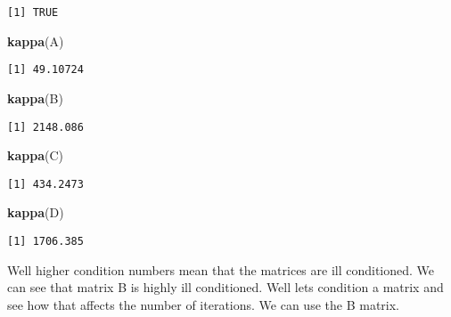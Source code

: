 \documentclass[]{article}
\newenvironment{Shaded}{\begin{snugshade}}{\end{snugshade}}
\newcommand{\KeywordTok}[1]{\textcolor[rgb]{0.13,0.29,0.53}{\textbf{#1}}}
\newcommand{\NormalTok}[1]{#1}
\begin{document}
\begin{verbatim}
[1] TRUE
\end{verbatim}

\begin{Shaded}
\begin{Highlighting}[]
\KeywordTok{kappa}\NormalTok{(A)}
\end{Highlighting}
\end{Shaded}

\begin{verbatim}
[1] 49.10724
\end{verbatim}

\begin{Shaded}
\begin{Highlighting}[]
\KeywordTok{kappa}\NormalTok{(B)}
\end{Highlighting}
\end{Shaded}

\begin{verbatim}
[1] 2148.086
\end{verbatim}

\begin{Shaded}
\begin{Highlighting}[]
\KeywordTok{kappa}\NormalTok{(C)}
\end{Highlighting}
\end{Shaded}

\begin{verbatim}
[1] 434.2473
\end{verbatim}

\begin{Shaded}
\begin{Highlighting}[]
\KeywordTok{kappa}\NormalTok{(D)}
\end{Highlighting}
\end{Shaded}

\begin{verbatim}
[1] 1706.385
\end{verbatim}

Well higher condition numbers mean that the matrices are ill
conditioned. We can see that matrix B is highly ill conditioned. Well
lets condition a matrix and see how that affects the number of
iterations. We can use the B matrix.
\end{document}
